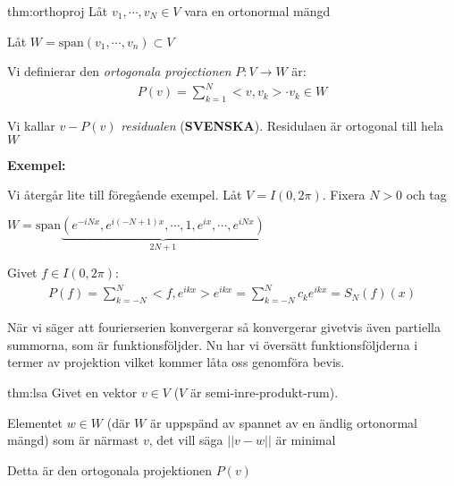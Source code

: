 \par\bigskip
\begin{theo}{thm:orthoproj}
  Låt $v_1,\cdots,v_N\in V$ vara en ortonormal mängd\par
  \noindent Låt $W = \text{span}(v_1,\cdots,v_n)\subset V$
  \par\bigskip
  \noindent Vi definierar den \textit{ortogonala projectionen} $P:V\to W$ är:
  \begin{equation*}
    \begin{gathered}
      P(v) = \sum_{k=1}^{N}<v,v_k>\cdot v_k\in W
    \end{gathered}
  \end{equation*}
  \par\bigskip
  \noindent Vi kallar $v-P(v)$ \textit{residualen} (\textbf{SVENSKA}). Residulaen är ortogonal till hela $W$
\end{theo}
\newpage
\noindent\textbf{Exempel:}\par
\noindent Vi återgår lite till föregående exempel. Låt $V = I(0,2\pi)$. Fixera $N>0$ och tag \par
$W = \text{span}\underbrace{(e^{-iNx},e^{i(-N+1)x},\cdots,1,e^{ix},\cdots,e^{iNx})}_{\text{$2N+1$}}$
\par\bigskip
\noindent Givet $f\in I(0,2\pi)$:
\begin{equation*}
  \begin{gathered}
    P(f) = \sum_{k=-N}^{N}<f,e^{ikx}>e^{ikx} = \sum_{k=-N}^{N}c_ke^{ikx} = S_N(f)(x)
  \end{gathered}
\end{equation*}
\par\bigskip
\noindent När vi säger att fourierserien konvergerar så konvergerar givetvis även partiella summorna, som är funktionsföljder. Nu har vi översätt funktionsföljderna i termer av projektion vilket kommer låta oss genomföra bevis.
\par\bigskip
\begin{theo}{thm:lsa}
  Givet en vektor $v\in V$ ($V$ är semi-inre-produkt-rum).\par
  \noindent Elementet $w\in W$ (där $W$ är uppspänd av spannet av en ändlig ortonormal mängd) som är närmast $v$, det vill säga $\left|\left|v-w\right|\right|$ är minimal
  \par\bigskip
  \noindent Detta är den ortogonala projektionen $P(v)$
\end{theo}
